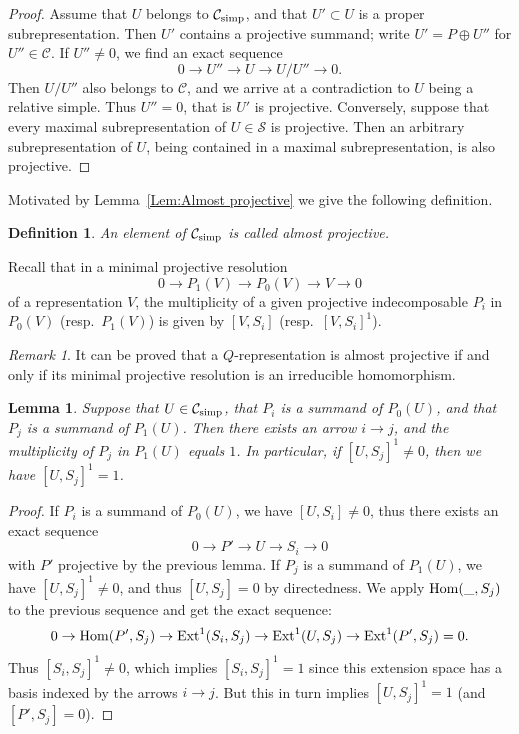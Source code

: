 \documentclass{amsart}
\newtheorem{definition}[theorem]{Definition}
\numberwithin{equation}{section}
\newtheorem{lem}[thm]{Lemma}
\theoremstyle{remark}
\newtheorem{rem}[thm]{Remark}
\begin{document}
\begin{proof} Assume that $U$ belongs to $\mathcal{C}_{\rm simp}$, and that $U'\subset U$ is a proper subrepresentation. Then $U'$ contains a projective summand; write $U'=P\oplus U''$ for $U''\in\mathcal{C}$. If $U''\not=0$, we find an exact sequence
$$0\rightarrow U''\rightarrow U\rightarrow U/U''\rightarrow 0.$$
Then $U/U''$ also belongs to $\mathcal{C}$, and we arrive at a contradiction to $U$ being a relative simple. Thus $U''=0$, that is $U'$ is projective. Conversely, suppose 
that every maximal subrepresentation of $U\in\mathcal{S}$ is projective. Then an arbitrary 
subrepresentation of $U$, 
being contained in a maximal subrepresentation, is also projective.\end{proof}

Motivated by Lemma~\ref{Lem:Almost projective} we give the following definition. 
\begin{definition}
An element of $\mathcal{C}_{\rm simp}$ is called \emph{almost projective}.
\end{definition}

Recall that in a minimal projective resolution
\[
0\rightarrow P_1(V)\rightarrow P_0(V)\rightarrow V\rightarrow 0
\]
of a representation $V$, the multiplicity of a given projective indecomposable $P_i$ in $P_0(V)$ 
(resp.~$P_1(V)$) is given by $[V,S_i]$ (resp.~$[V,S_i]^1$).


\begin{rem}
It can be proved that a $Q$-representation is almost projective if and only if its minimal projective 
resolution is an irreducible homomorphism.  
\end{rem}
\begin{lem}\label{lemij} Suppose that $U\in\mathcal{C}_{\rm simp}$, that $P_i$ is a summand of 
$P_0(U)$, and that $P_j$ is a summand of $P_1(U)$. Then there exists an arrow $i\rightarrow j$, 
and the multiplicity of $P_j$ in $P_1(U)$ equals $1$. 
In particular, if $[U,S_j]^1\not=0$, then we have $[U,S_j]^1=1$.
\end{lem}

\begin{proof} 
If $P_i$ is a summand of $P_0(U)$, we have $[U,S_i]\not=0$, thus there exists an exact sequence
$$0\rightarrow P'\rightarrow U\rightarrow S_i\rightarrow 0$$
with $P'$ projective by the previous lemma. If $P_j$ is a summand of $P_1(U)$, we have $[U,S_j]^1\not=0$, and thus $[U,S_j]=0$ by directedness. We apply ${\rm Hom}(\_,S_j)$ to the previous sequence and get the exact sequence:
$$0\rightarrow {\rm Hom}(P',S_j)\rightarrow{\rm Ext}^1(S_i,S_j)\rightarrow{\rm Ext}^1(U,S_j)\rightarrow{\rm Ext}^1(P',S_j)=0.
$$
Thus $[S_i,S_j]^1\not=0$, which implies $[S_i,S_j]^1=1$ since this extension space has a basis indexed by the arrows $i\rightarrow j$. But this in turn implies $[U,S_j]^1=1$ (and $[P',S_j]=0$).\end{proof}
\end{document}
